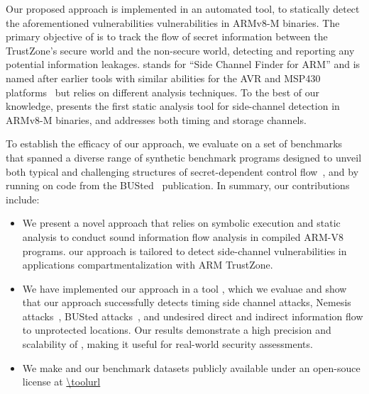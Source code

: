 Our proposed approach is implemented in an automated tool, \tool{} to
statically detect the aforementioned vulnerabilities vulnerabilities in
ARMv8-M binaries. The primary objective of \tool{} is to track the flow of
secret information between the TrustZone's secure world and the non-secure
world, detecting and reporting any potential information leakages. \tool{}
stands for ``Side Channel Finder for ARM'' and is named after earlier tools
with similar abilities for the AVR and MSP430 platforms~\cite{scfmsp,
MantelAVR} but relies on different analysis techniques.  To the best of our
knowledge, \tool{} presents the first static analysis tool for side-channel
detection in ARMv8-M binaries, and addresses both timing and storage
channels. 

To establish the efficacy of our approach, we evaluate \tool{} on a set of
benchmarks that spanned a diverse range of synthetic benchmark programs
designed to unveil both typical and challenging structures of
secret-dependent control flow~\cite{hans},
and by running \tool{} on code from the BUSted~\cite{busted} publication.
In summary, our contributions include:

\begin{itemize}
%
  \item{We present a novel approach that relies on symbolic execution and
static analysis to conduct sound information flow analysis in compiled
ARM-V8 programs. our approach is tailored to detect side-channel
vulnerabilities in applications compartmentalization with ARM TrustZone.}
%
  \item{We have implemented our approach in a tool \tool{}, which we
evaluae and show that our approach successfully detects  timing side
channel attacks, Nemesis attacks~\cite{Nemesis}, BUSted
attacks~\cite{busted}, and undesired direct and indirect information flow
to unprotected locations. Our results demonstrate a high precision and
scalability of \tool{}, making it useful for real-world security
assessments.}
%
  \item{We make \tool{} and our benchmark datasets publicly available under
an open-souce license at \url{\toolurl}
%
 }
%
\end{itemize}

